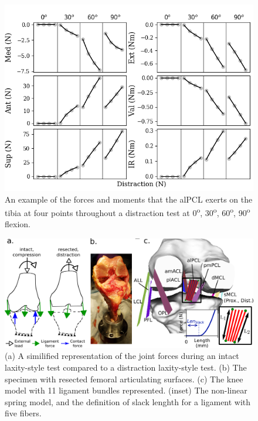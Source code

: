 \begin{figure}
    \centering
    \includegraphics[width=0.75\linewidth]{../img/Spec1_Distraction_alPCL_Forces.png}
    \caption{An example of the forces and moments that the alPCL exerts on the tibia at four points throughout a distraction test at 0\textsuperscript{o}, 30\textsuperscript{o}, 60\textsuperscript{o}, 90\textsuperscript{o} flexion.}
    \label{fig:alPclForce}
\end{figure}

\begin{figure}
    \centering
    \includegraphics[width=0.85\linewidth]{../img/TwoColumnFig.png}
    \caption{(a) A similified representation of the joint forces during an intact laxity-style test compared to a distraction laxity-style test. (b) The specimen with resected femoral articulating surfaces. (c) The knee model with 11 ligament bundles represented. (inset) The non-linear spring model, and the definition of slack lenghth for a ligament with five fibers.}
    \label{fig:kneeModel}
\end{figure}

